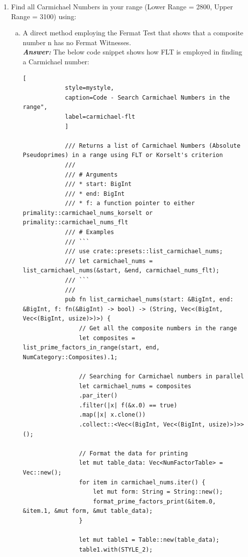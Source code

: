 \documentclass[11pt,a4paper]{article}
\begin{document}
\begin{enumerate}[1.]
\begin{flushleft}
\begin{lstlisting}[
			style=mystyle,
			caption=Code - Primality using GCD Test"
			]
					gcd = b;
				}

				gcd
			}
		}
		\end{lstlisting}

	\end{flushleft}
	\bigskip

	\item Find all Carmichael Numbers in your range (Lower Range = 2800, Upper Range = 3100) using:


	\begin{flushleft}
		\medskip
		\begin{enumerate}[(a)]
			\item A direct method employing the Fermat Test that shows that a composite number n has no Fermat Witnesses. \\
			\medskip
			\textbf{\textit{Answer:}} The below code snippet shows how FLT is employed in finding a Carmichael number:

			\begin{lstlisting}[
			style=mystyle,
			caption=Code - Search Carmichael Numbers in the range",
			label=carmichael-flt
			]

			/// Returns a list of Carmichael Numbers (Absolute Pseudoprimes) in a range using FLT or Korselt's criterion
			///
			/// # Arguments
			/// * start: BigInt
			/// * end: BigInt
			/// * f: a function pointer to either primality::carmichael_nums_korselt or primality::carmichael_nums_flt
			/// # Examples
			/// ```
			/// use crate::presets::list_carmichael_nums;
			/// let carmichael_nums = list_carmichael_nums(&start, &end, carmichael_nums_flt);
			/// ```
			///
			pub fn list_carmichael_nums(start: &BigInt, end: &BigInt, f: fn(&BigInt) -> bool) -> (String, Vec<(BigInt, Vec<(BigInt, usize)>)>) {
				// Get all the composite numbers in the range
				let composites = list_prime_factors_in_range(start, end, NumCategory::Composites).1;

				// Searching for Carmichael numbers in parallel
				let carmichael_nums = composites
				.par_iter()
				.filter(|x| f(&x.0) == true)
				.map(|x| x.clone())
				.collect::<Vec<(BigInt, Vec<(BigInt, usize)>)>>();

				// Format the data for printing
				let mut table_data: Vec<NumFactorTable> = Vec::new();
				for item in carmichael_nums.iter() {
					let mut form: String = String::new();
					format_prime_factors_print(&item.0, &item.1, &mut form, &mut table_data);
				}

				let mut table1 = Table::new(table_data);
				table1.with(STYLE_2);


\end{lstlisting}
\end{enumerate}
\end{flushleft}
\end{enumerate}
\end{document}
